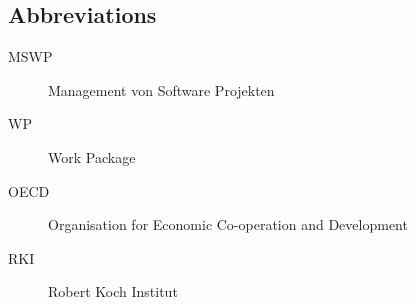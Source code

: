 \documentclass[a4paper,11pt]{article}
\begin{document}
\begin{appendix}

\pagebreak

{}


\nocite{*}



\pagebreak

\section*{Abbreviations}
 
 \begin{description}
  \item[MSWP] Management von Software Projekten
  \item[WP] Work Package
  \item[OECD] Organisation for Economic Co-operation and Development
  \item[RKI] Robert Koch Institut
 \end{description}

\end{appendix}
\end{document}
